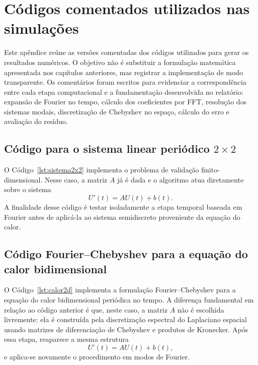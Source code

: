 
\chapter{Códigos comentados utilizados nas simulações}

Este apêndice reúne as versões comentadas dos códigos utilizados para gerar os resultados numéricos. O objetivo não é substituir a formulação matemática apresentada nos capítulos anteriores, mas registrar a implementação de modo transparente. Os comentários foram escritos para evidenciar a correspondência entre cada etapa computacional e a fundamentação desenvolvida no relatório: expansão de Fourier no tempo, cálculo dos coeficientes por FFT, resolução dos sistemas modais, discretização de Chebyshev no espaço, cálculo do erro e avaliação do resíduo.

\section{Código para o sistema linear periódico \texorpdfstring{\(2\times2\)}{2x2}}

O Código~\ref{lst:sistema2x2} implementa o problema de validação finito-dimensional. Nesse caso, a matriz \(A\) já é dada e o algoritmo atua diretamente sobre o sistema
\[
U'(t)=AU(t)+b(t).
\]
A finalidade desse código é testar isoladamente a etapa temporal baseada em Fourier antes de aplicá-la ao sistema semidiscreto proveniente da equação do calor.



\section{Código Fourier--Chebyshev para a equação do calor bidimensional}

O Código~\ref{lst:calor2d} implementa a formulação Fourier--Chebyshev para a equação do calor bidimensional periódica no tempo. A diferença fundamental em relação ao código anterior é que, neste caso, a matriz \(A\) não é escolhida livremente: ela é construída pela discretização espectral do Laplaciano espacial usando matrizes de diferenciação de Chebyshev e produtos de Kronecker. Após essa etapa, reaparece a mesma estrutura
\[
U'(t)=AU(t)+b(t),
\]
e aplica-se novamente o procedimento em modos de Fourier.



